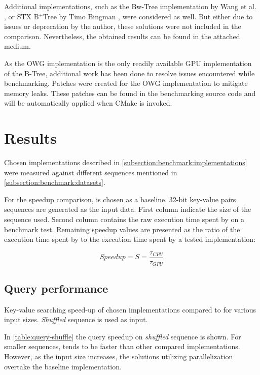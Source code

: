 Additional implementations, such as the Bw-Tree \cite{bw-tree} implementation by Wang et al. \cite{bwtree-impl}, or STX B$^+$Tree by Timo Bingman \cite{stx-b+tree}, were considered as well. But either due to issues or deprecation by the author, these solutions were not included in the comparison. Nevertheless, the obtained results can be found in the attached medium.

As the OWG implementation is the only readily available GPU implementation of the B-Tree, additional work has been done to resolve issues encountered while benchmarking. Patches were created for the OWG implementation to mitigate memory leaks. These patches can be found in the benchmarking source code and will be automatically applied when CMake is invoked.

\section{Results}\label{section:results}

Chosen implementations described in \cref{subsection:benchmark:implementations} were measured against different sequences mentioned in \cref{subsection:benchmark:datasets}.

For the speedup comparison,  is chosen as a baseline. 32-bit key-value pairs sequences are generated as the input data. First column indicate the size of the sequence used. Second column contains the raw execution time spent by  on a benchmark test. Remaining speedup values are presented as the ratio of the execution time spent by  to the execution time spent by a tested implementation:

$$\mathit{Speedup} = S = \frac{\tau_{\mathit{CPU}}}{\tau_{\mathit{GPU}}}$$

\subsection{Query performance}
\begin{table}
  \centering
  
  \caption{Key-value searching speed-up of chosen implementations compared to  for various input sizes. \textit{Shuffled} sequence is used as input.}
  \label{table:query-shuffle}
\end{table}

In \cref{table:query-shuffle} the query speedup on \textit{shuffled} sequence is shown. For smaller sequences,  tends to be faster than other compared implementations. However, as the input size increases, the solutions utilizing parallelization overtake the baseline implementation.

